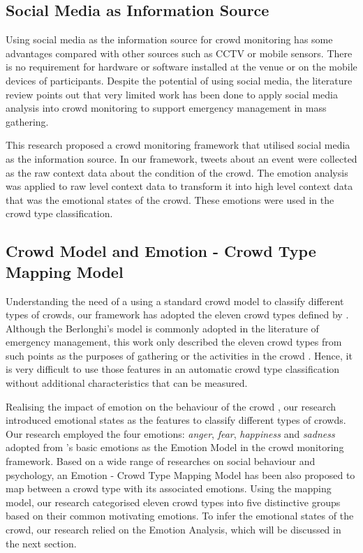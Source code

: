 \subsection{Social Media as Information Source}
Using social media as the information source for crowd monitoring has some advantages compared with other sources such as CCTV or mobile sensors. There is no requirement for hardware or software installed at the venue or on the mobile devices of participants. Despite the potential of using social media, the literature review points out that very limited work has been done to apply social media analysis into crowd monitoring to support emergency management in mass gathering.

This research proposed a crowd monitoring framework that utilised social media as the information source. In our framework, tweets about an event were collected as the raw context data about the condition of the crowd. The emotion analysis was applied to raw level context data to transform it into high level context data that was the emotional states of the crowd. These emotions were used in the crowd type classification.

\subsection{Crowd Model and Emotion - Crowd Type Mapping Model}
Understanding the need of a using a standard crowd model to classify different types of crowds, our framework has adopted the eleven crowd types defined by \textcite{Berlonghi1995}. Although the Berlonghi's model is commonly adopted in the literature of emergency management, this work only described the eleven crowd types from such points as the purposes of gathering or the activities in the crowd \parencite{Zeitz2009}. Hence, it is very difficult to use those features in an automatic crowd type classification without additional characteristics that can be measured.

Realising the impact of emotion on the behaviour of the crowd \parencite{Kornblum2011}, our research introduced emotional states as the features to classify different types of crowds. Our research employed the four emotions: \textit{anger}, \textit{fear}, \textit{happiness} and \textit{sadness} adopted from \textcite{ekman1971constants}'s basic emotions as the Emotion Model in the crowd monitoring framework. Based on a wide range of researches on social behaviour and psychology, an Emotion - Crowd Type Mapping Model has been also proposed to map between a crowd type with its associated emotions. Using the mapping model, our research categorised eleven crowd types into five distinctive groups based on their common motivating emotions. To infer the emotional states of the crowd, our research relied on the Emotion Analysis, which will be discussed in the next section.

